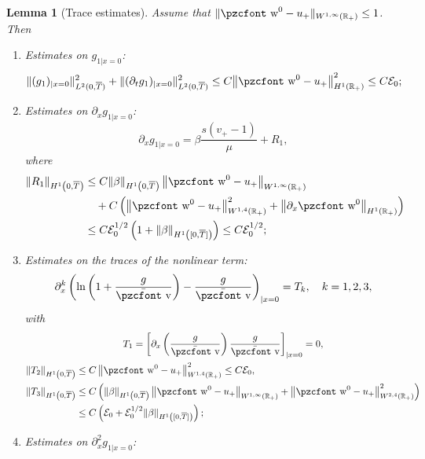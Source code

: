 \documentclass[10pt]{amsart}
\newtheorem{lemm}[theo]{Lemma}\newtheorem{prop}[theo]{Proposition}\newtheorem{coro}[theo]{Corollary}\newtheorem{conj}[theo]{Conjecture}
\theoremstyle{definition}\newtheorem{defi}[theo]{Definition}\newtheorem{rema}[theo]{Remark}\newtheorem{exam}[theo]{Example}\newtheorem{exem}[theo]{Example}\newtheorem{nota}[theo]{Notation}
\newcommand{\mathpzc}[1]{\text{\pzcfont #1}}
\newcommand{\R}{\mathbb{R}}
\newcommand{\p}{\partial}
\newcommand{\bv}{\bar{\mathpzc{v}}}
\newcommand{\cE}{\mathcal E}
\newcommand{\tw}{\mathpzc{w}}
\begin{document}
\begin{lemm}[Trace estimates]\label{lem:traces}
Assume that $\|\tw^0-u_+\|_{W^{1,\infty}(\R_+)}\leq 1$. Then
\begin{enumerate}
\item\label{lemm6.4.1} Estimates on $g_{1|x=0}$:
\begin{equation}\label{est:bc-g1}
\|(g_1)_{|x=0}\|_{L^2(0,\overline{T})}^2 + \|(\partial_t g_1)_{|x=0}\|_{L^2(0,\overline{T})}^2
\leq C{\left\|\tw^0- u_+\right\|^2_{H^1(\R_+)}}
\leq C \cE_0;
\end{equation}

\item\label{lemm6.4.2} Estimates on $\p_x g_{1|x=0}$:
\begin{equation}\label{g1-R1}
\p_x g_{1|x=0}= \beta \dfrac{s(v_+ - 1)}{\mu} + R_1,
\end{equation}
where
\begin{align*}
\|R_1\|_{H^1\left(0,\overline{T}\right)}&\leq C\|\beta\|_{H^1\left(0,\overline{T}\right)}\left\|\tw^0- u_+\right\|_{W^{1,\infty}(\R_+)} \\
&\quad+ C \left(\left\|\tw^0-u_+\right\|_{W^{1,4}(\R_+)}^2 + \left\|\p_x \tw^0\right\|_{H^1(\R_+)}\right)\\
&\leq C \cE_0^{1/2} \left(1 + \|\beta\|_{H^1\left([0, \overline{T}]\right)}\right) \leq C \cE_0^{1/2};
\end{align*}
\item\label{lemm6.4.3} Estimates on the traces of the nonlinear term:
\[
\p_x^k \left(\ln \left(1+ \frac{g}{\bv}\right) - \frac{g}{\bv} \right)_{|x=0}=T_k, \quad k=1,2,3,
\]
with
\begin{multline}\label{est:traces-NL}
T_1 = \left[\partial_x \left(\dfrac{g}{\bv} \right)\dfrac{g}{\bv}\right]_{|x=0} = 0, \\
\begin{aligned}
\|T_2\|_{H^1\left(0,\overline{T}\right)}&\leq C \left\|\tw^0-u_+\right\|_{W^{1,4}(\R_+)}^2\leq C \cE_0,\\
\|T_3\|_{H^1\left(0,\overline{T}\right)}&\leq C \left(\|\beta\|_{H^1\left(0, \overline{T}\right)}\left\|\tw^0-u_+\right\|_{W^{1,\infty}(\R_+)} + \left\|\tw^0-u_+\right\|_{W^{2,4}(\R_+)}^2\right)\\
&\leq C \left(\cE_0 + \cE_0^{1/2} \|\beta\|_{H^1\left([0, \overline{T}]\right)}\right);
\end{aligned}
\end{multline}
\item\label{lemm6.4.4} Estimates on $\p_x^2 g_{1|x=0}$:
\begin{equation}\label{bc:px2g1}

\end{equation}
\end{enumerate}
\end{lemm}
\end{document}
